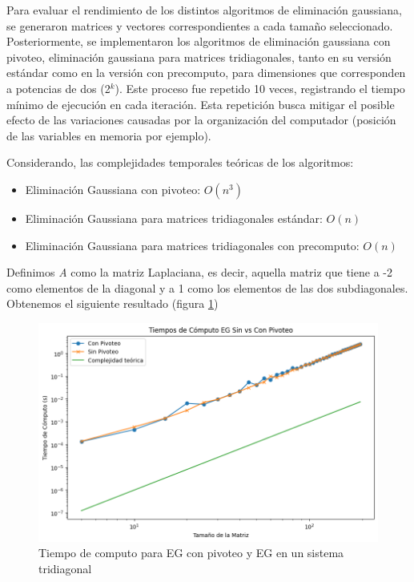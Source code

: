     Para evaluar el rendimiento de los distintos algoritmos de eliminación gaussiana, se generaron matrices y vectores correspondientes a cada tamaño seleccionado. Posteriormente, se implementaron los algoritmos de eliminación gaussiana con pivoteo, eliminación gaussiana para matrices tridiagonales, tanto en su versión estándar como en la versión con precomputo, para dimensiones que corresponden a potencias de dos (2$^k$). Este proceso fue repetido 10 veces, registrando el tiempo mínimo de ejecución en cada iteración. Esta repetición busca mitigar el posible efecto de las variaciones causadas por la organización del computador (posición de las variables en memoria por ejemplo).

    Considerando, las complejidades temporales teóricas de los algoritmos:

    \begin{itemize}
       \item Eliminación Gaussiana con pivoteo: $O(n^{3})$
        \item Eliminación Gaussiana para matrices tridiagonales estándar: $O(n)$
        \item Eliminación Gaussiana para matrices tridiagonales con precomputo: $O(n)$
    \end{itemize}


    Definimos \textit{A} como la matriz Laplaciana, es decir, aquella matriz que tiene a -2 como elementos de la diagonal y a 1 como los elementos de las dos subdiagonales. Obtenemos el siguiente resultado (figura \ref{result_ej5})

    \begin{figure}[H]
    \centerline{\includegraphics[scale=0.45]{./img/tiempos_EGsinVsConPivoteo.png}}
    \caption{Tiempo de computo para EG con pivoteo y EG en un sistema tridiagonal}
    \label{result_ej5}
    \end{figure}

